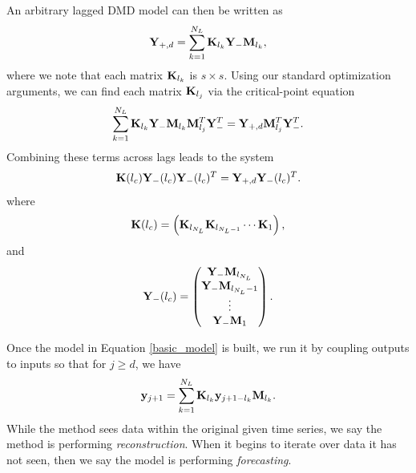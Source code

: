 \documentclass[a4paper,11pt]{article}
\begin{document}
An arbitrary lagged DMD model can then be written as 
\begin{equation}
{\bf Y}_{+,d} = \sum_{k=1}^{N_{L}}{\bf K}_{l_{k}}{\bf Y}_{-}{\bf M}_{l_{k}},
\label{basic_model}
\end{equation}
where we note that each matrix ${\bf K}_{l_{k}}$ is $s\times s$.  Using our standard optimization arguments, we can find each matrix ${\bf K}_{l_{j}}$ via the critical-point equation
\[
\sum_{k=1}^{N_{L}}{\bf K}_{l_{k}}{\bf Y}_{-}{\bf M}_{l_{k}}{\bf M}_{l_{j}}^{T}{\bf Y}_{-}^{T} = {\bf Y}_{+,d}{\bf M}_{l_{j}}^{T}{\bf Y}_{-}^{T}.
\]
Combining these terms across lags leads to the system 
\[
{\bf K}(l_{c}) {\bf Y}_{-}(l_{c}){\bf Y}_{-}(l_{c})^{T} = {\bf Y}_{+, d}{\bf Y}_{-}(l_{c})^{T}.
\]
where
\[
{\bf K}(l_{c}) = \left({\bf K}_{l_{N_{L}}} {\bf K}_{l_{N_{L}-1}} \cdots {\bf K}_{1}\right), 
\]
and
\[
{\bf Y}_{-}(l_{c}) = \begin{pmatrix} {\bf Y}_{-}{\bf M}_{l_{N_{L}}} \\ {\bf Y}_{-}{\bf M}_{l_{N_{L}}-1} \\ \vdots \\ {\bf Y}_{-}{\bf M}_{1} \end{pmatrix}.
\]

Once the model in Equation \eqref{basic_model} is built, we run it by coupling outputs to inputs so that for $j\geq d$, we have 
\begin{equation}
{\bf y}_{j+1} = \sum_{k=1}^{N_{L}}{\bf K}_{l_{k}}{\bf y}_{j+1-l_{k}}{\bf M}_{l_{k}}.  
\label{iterator}
\end{equation}
While the method sees data within the original given time series, we say the method is performing {\it reconstruction}.  When it begins to iterate over data it has not seen, then we say the model is performing {\it forecasting}. 
\end{document}
